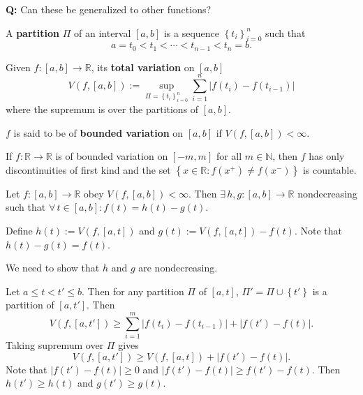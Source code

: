 \documentclass{notes}
\begin{document}
  {\boldmath \bfseries  Q:} Can these be generalized to other functions?

  \begin{defn}
    A {\boldmath \bfseries partition} $\Pi$ of an interval $[a, b]$ is a sequence $\left \{ t_i \right \}_{i = 0}^n$ such that 
    \[
      a = t_0 < t_{1} < \cdots < t_{n - 1} < t_n = b.
    \]
  \end{defn}
  
  \begin{defn}
    Given $f \colon [a, b] \to \mathbb R$, its {\boldmath \bfseries total variation} on $[a, b]$
    \[
      V(f, [a, b]) := \sup_{\Pi = \left \{ t_i \right \}_{i = 0}^n} \sum_{i = 1}^n \left | f(t_i) - f(t_{i - 1}) \right | 
    \]
    where the supremum is over the partitions of $[a, b]$.
  \end{defn}
  
  \begin{defn}
    $f$ is said to be of {\boldmath \bfseries bounded variation} on $[a, b]$ if $V(f, [a, b]) < \infty$.
  \end{defn}
  
  \begin{lem}
    If $f \colon \mathbb R \to \mathbb R$ is of bounded variation on $[-m, m]$ for all $m \in \mathbb N$, then $f$ has only discontinuities of first kind and the set $\left \{ x \in \mathbb R : f(x^+) \neq f(x^-) \right \}$ is countable.
  \end{lem}
  
  \begin{thm}
    Let $f \colon [a, b] \to \mathbb R$ obey $V(f, [a, b]) < \infty$.
    Then $\exists \, h, g \colon [a, b] \to \mathbb R$ nondecreasing such that $\forall \, t \in [a, b]: f(t) = h(t) - g(t)$.
  \end{thm}
  
  \begin{prf}
    Define $h(t) := V(f, [a, t])$ and $g(t) := V(f, [a, t]) - f(t)$.
    Note that $h(t) - g(t) = f(t)$.

    We need to show that $h$ and $g$ are nondecreasing.
    
    Let $a \leq t < t' \leq b$.
    Then for any partition $\Pi$ of $[a, t]$, $\Pi' = \Pi \cup \left \{ t' \right \}$ is a partition of $[a, t']$.
    Then 
    \[
      V(f, [a, t']) \geq \sum_{i = 1}^m \left | f(t_i) - f(t_{i - 1}) \right | + \left | f(t') - f(t) \right |.
    \]
    Taking supremum over $\Pi$ gives 
    \[
      V(f, [a, t']) \geq V(f, [a, t]) + \left | f(t') - f(t) \right |.
    \]
    Note that $\left | f(t') - f(t) \right | \geq 0$ and $\left | f(t') - f(t) \right | \geq f(t') - f(t)$.
    Then $h(t') \geq h(t)$ and $g(t') \geq g(t)$.
  \end{prf}
  
\end{document}
